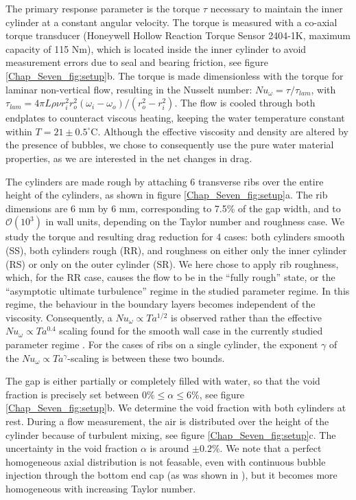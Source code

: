 \documentclass{jfm}
\newcommand{\Ta}{T\!a}
\newcommand{\Nuw}{N\!u_{\omega}}
\begin{document}
The primary response parameter is the torque $\tau$ necessary to maintain the inner cylinder at a constant angular velocity. The torque is measured with a co-axial torque transducer (Honeywell Hollow Reaction Torque Sensor 2404-1K, maximum capacity of 115 Nm), which is located inside the inner cylinder to avoid measurement errors due to seal and bearing friction, see figure \ref{Chap_Seven_fig:setup}b. The torque is made dimensionless with the torque for laminar non-vertical flow, resulting in the Nusselt number: $\Nuw = \tau / \tau_{lam}$, with $\tau_{lam} = 4 \pi L \rho \nu r_i^2 r_o^2 ( \omega_i-\omega_o) / (r_o^2 -r_i^2) $. 
The flow is cooled through both endplates to counteract viscous heating, keeping the water temperature constant within $T=21 \pm0.5^{\circ}$C. Although the effective viscosity and density are altered by the presence of bubbles, we chose to consequently use the pure water material properties, as we are interested in the net changes in drag.

The cylinders are made rough by attaching 6 transverse ribs over the entire height of the cylinders, as shown in figure \ref{Chap_Seven_fig:setup}a. The rib dimensions are $6$ mm by $6$ mm, corresponding to 7.5\% of the gap width, and  to $\mathcal{O}(10^3)$ in wall units, depending on the Taylor number and roughness case. We study the torque and resulting drag reduction for 4 cases: both cylinders smooth (SS), both cylinders rough (RR), and roughness on either only the inner cylinder (RS) or only on the outer cylinder (SR). We here chose to apply rib roughness, which, for the RR case, causes the flow to be in the ``fully rough'' state, or the ``asymptotic ultimate turbulence'' regime \citep{zhu18} in the studied parameter regime. In this regime, the behaviour in the boundary layers becomes independent of the viscosity. Consequently, a $\Nuw \propto \Ta^{1/2}$ is observed rather than the effective $\Nuw\propto \Ta ^{0.4}$ scaling found for the smooth wall case in the currently studied parameter regime \citep{kra62,gil11,zhu18}. For the cases of ribs on a single cylinder, the exponent $\gamma$ of the $\Nuw \propto \Ta^{\gamma}$-scaling is between these two bounds.

The gap is either partially or completely filled with water, so that the void fraction is precisely set between $0\%\leq \alpha \leq 6\%$, see figure \ref{Chap_Seven_fig:setup}b. We determine the void fraction with both cylinders at rest. During a flow measurement, the air is distributed over the height of the cylinder because of turbulent mixing, see figure \ref{Chap_Seven_fig:setup}c. The uncertainty in the void fraction $\alpha$ is around $\pm0.2\%$. We note that a perfect homogeneous axial distribution is not feasable, even with continuous bubble injection through the bottom end cap (as was shown in \citep{gil13}), but it becomes more homogeneous with increasing Taylor number.
\end{document}
